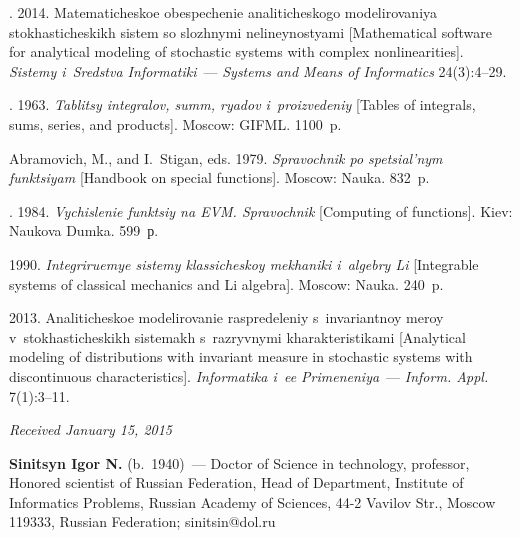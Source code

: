 \begin{multicols}{2}
{{\begin{thebibliography}{99}
. 2014.
Matematicheskoe obespechenie analiticheskogo modelirovaniya stokhasticheskikh
sistem so slozhnymi nelineynostyami [Mathematical software for
analytical modeling of stochastic systems with complex nonlinearities].
\textit{Sistemy i~Sredstva Informatiki}~---
\textit{Systems and Means of Informatics}  24(3):4--29.


.  1963.
\textit{Tablitsy integralov, summ, ryadov i~proizvedeniy}
[Tables of integrals, sums, series, and products]. Moscow:  GIFML.  1100~p.

Abramovich, M.,  and I.~Stigan, eds. 1979.
\textit{Spravochnik po spetsial'nym funktsiyam} [Handbook on special functions].
Moscow:  Nauka.  832~p.

.  1984.
\textit{Vychislenie funktsiy na EVM. Spravochnik} [Computing of functions].
Kiev: Naukova Dumka.  599~р.

  1990.
\textit{Integriruemye sistemy klassicheskoy mekhaniki i~algebry Li}
[Integrable systems of classical mechanics and Li algebra]. Moscow: Nauka.  240~p.

  2013.
Analiticheskoe modelirovanie raspredeleniy s~invariantnoy meroy
v~stokhasticheskikh sistemakh s~razryvnymi kharakteristikami
[Analytical modeling
of distributions with invariant measure in stochastic systems with
discontinuous characteristics].
\textit{Informatika i~ee Primeneniya}~---
\textit{Inform. Appl.}  7(1):3--11.

\end{thebibliography}

 }
 }

\end{multicols}

\vspace*{-3pt}

\hfill{\small\textit{Received January 15, 2015}}


\Contr

\noindent
\textbf{Sinitsyn Igor N.} (b.\ 1940)~--- Doctor of Science in technology,
professor, Honored scientist of Russian Federation, Head of Department,
Institute of Informatics Problems, Russian Academy of Sciences,
44-2 Vavilov Str., Moscow 119333,
Russian Federation; sinitsin@dol.ru


